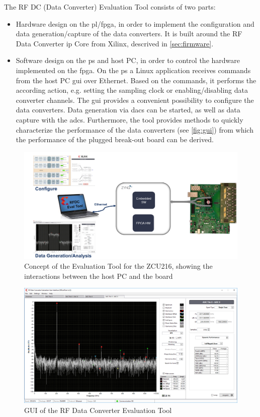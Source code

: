 The RF DC (Data Converter) Evaluation Tool consists of two parts:
\begin{itemize}
	\item Hardware design on the \gls{pl}/\gls{fpga}, in order to implement the configuration and data generation/capture of the data converters. It is built around the RF Data Converter \gls{ip} Core from Xilinx, descrived in \autoref{sec:firmware}.
	\item Software design on the \gls{ps} and host PC, in order to control the hardware implemented on the \gls{fpga}.
	On the \gls{ps} a Linux application receives commands from the host PC \gls{gui} over Ethernet. Based on the commands, it performs the according action, e.g. setting the sampling clock or enabling/disabling data converter channels. The \gls{gui} provides a convenient possibility to configure the data converters. Data generation via \glspl{dac} can be started, as well as data capture with the \glspl{adc}. Furthermore, the tool provides methods to quickly characterize the performance of the data converters (see \autoref{fig:gui}) from which the performance of the plugged break-out board can be derived.
\end{itemize}

\begin{figure}[tbh]
	\centering
	\includegraphics[width = \textwidth]{chap/04-work/img/zcu216evaltool}
	\caption[ZCU216 Evaluation Tool]{Concept of the Evaluation Tool for the ZCU216, showing the interactions between the host PC and the board}
	\label{fig:evalTool}
\end{figure}

\begin{figure}[tbh]
	\centering
	\includegraphics[width = \textwidth]{chap/04-work/img/evaltool}
	\caption{GUI of the RF Data Converter Evaluation Tool}
	\label{fig:gui}
\end{figure}

